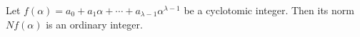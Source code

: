 Let $f(\alpha) = a_0 + a_1\alpha + \cdots + a_{\lambda-1}\alpha^{\lambda-1}$ be a cyclotomic integer. Then its norm $Nf(\alpha)$ is an ordinary integer.
